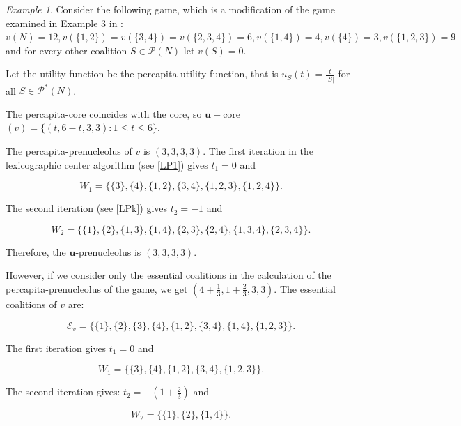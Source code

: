 \documentclass[a4paper,12pt]{article}
\theoremstyle{definition}
\theoremstyle{remark}
\newtheorem{example}[theorem]{Example}
\begin{document}
\begin{example}
Consider the following game, which is a modification of the game examined in Example 3 in \citet{Solymosi2019}: $v(N) = 12, v(\{ 1, 2\} ) = v(\{ 3, 4\} ) = v(\{ 2, 3, 4\} ) = 6, v(\{ 1, 4\} ) = 4, v(\{ 4\} ) = 3, v(\{ 1, 2, 3\} ) = 9$ and for every other coalition $S\in \mathcal{P}(N)$ let $v(S) = 0$.

Let the utility function be the percapita-utility function, that is $u_S(t) = \frac{t}{|S|}$ for all $S\in \mathcal{P}^*(N)$.

The percapita-core coincides with the core, so $\mathbf{u}-$core$(v) = \{ (t, 6-t, 3, 3) \colon 1\leq t \leq 6 \}$.

The percapita-prenucleolus of $v$ is $(3, 3, 3, 3)$. The first iteration in the lexicographic center algorithm (see \eqref{LP1}) gives $t_1 = 0$ and 

\begin{equation*}
W_1 = \{ \{ 3\} ,  \{ 4\} , \{ 1, 2\} ,  \{ 3, 4\} , \{ 1, 2, 3\} ,  \{ 1, 2, 4\} \}.
\end{equation*}

The second iteration (see \eqref{LPk}) gives $t_2 = -1$ and  

\begin{equation*}
W_2 = \{  \{ 1\} ,  \{ 2\} ,  \{ 1, 3\} ,  \{ 1, 4\} ,  \{ 2, 3\} ,  \{ 2, 4\} ,  \{ 1, 3, 4\} ,  \{ 2, 3, 4\} \} .
\end{equation*}

Therefore, the $\mathbf{u}$-prenucleolus is $(3, 3, 3, 3)$.

However, if we consider only the essential coalitions in the calculation of the percapita-prenucleolus of the game, we get $(4 + \frac{1}{3}, 1 + \frac{2}{3}, 3, 3)$. The essential coalitions of $v$ are: 

\begin{equation*}
\mathcal{E}_v = \{ \{ 1 \} ,  \{ 2\} ,  \{ 3\} ,  \{ 4\} ,  \{ 1, 2\} ,  \{ 3, 4\} ,  \{ 1, 4\} ,  \{ 1, 2, 3\} \}.
\end{equation*}

The first iteration gives $t_1 = 0$ and

\begin{equation*}
W_1 = \{  \{ 3\} ,  \{ 4\} ,  \{ 1, 2\} ,  \{ 3, 4\} ,  \{ 1, 2, 3\}  \}.
\end{equation*}

The second iteration gives: $t_2 = -(1 + \frac{2}{3})$ and

\begin{equation*}
W_2 = \{ \{ 1\} , \{ 2\} , \{ 1, 4\} \}.
\end{equation*}


\end{example}
\end{document}
